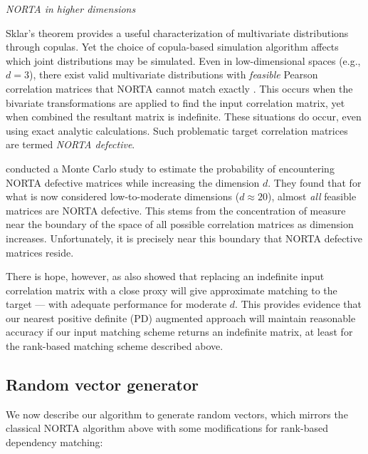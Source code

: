 \documentclass[
]{jss}
\begin{document}
\emph{NORTA in higher dimensions}

Sklar's theorem provides a useful characterization of multivariate
distributions through copulas. Yet the choice of copula-based simulation
algorithm affects which joint distributions may be simulated. Even in
low-dimensional spaces (e.g., \(d=3\)), there exist valid multivariate
distributions with \emph{feasible} Pearson correlation matrices that
NORTA cannot match exactly \citep{LH75}. This occurs when the bivariate
transformations are applied to find the input correlation matrix, yet
when combined the resultant matrix is indefinite. These situations do
occur, even using exact analytic calculations. Such problematic target
correlation matrices are termed \emph{NORTA defective}.

\citet{GH02} conducted a Monte Carlo study to estimate the probability
of encountering NORTA defective matrices while increasing the dimension
\(d\). They found that for what is now considered low-to-moderate
dimensions (\(d \approx 20\)), almost \emph{all} feasible matrices are
NORTA defective. This stems from the concentration of measure near the
boundary of the space of all possible correlation matrices as dimension
increases. Unfortunately, it is precisely near this boundary that NORTA
defective matrices reside.

There is hope, however, as \citet{GH02} also showed that replacing an
indefinite input correlation matrix with a close proxy will give
approximate matching to the target --- with adequate performance for
moderate \(d\). This provides evidence that our nearest positive
definite (PD) augmented approach will maintain reasonable accuracy if
our input matching scheme returns an indefinite matrix, at least for the
rank-based matching scheme described above.

\hypertarget{rand-vec-gen}{%
\subsection{Random vector generator}\label{rand-vec-gen}}

We now describe our algorithm to generate random vectors, which mirrors
the classical NORTA algorithm above with some modifications for
rank-based dependency matching:

\end{document}
